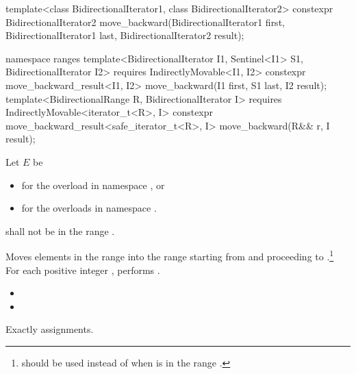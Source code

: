 %
\begin{itemdecl}
template<class BidirectionalIterator1, class BidirectionalIterator2>
  constexpr BidirectionalIterator2
    move_backward(BidirectionalIterator1 first, BidirectionalIterator1 last,
                  BidirectionalIterator2 result);
\end{itemdecl}
\begin{addedblock}
\begin{itemdecl}
namespace ranges {
  template<BidirectionalIterator I1, Sentinel<I1> S1, BidirectionalIterator I2>
    requires IndirectlyMovable<I1, I2>
    constexpr move_backward_result<I1, I2>
      move_backward(I1 first, S1 last, I2 result);
  template<BidirectionalRange R, BidirectionalIterator I>
    requires IndirectlyMovable<iterator_t<R>, I>
    constexpr move_backward_result<safe_iterator_t<R>, I>
      move_backward(R&& r, I result);
}
\end{itemdecl}
\end{addedblock}

\begin{itemdescr}
\begin{addedblock}
\pnum
Let $E$ be
\begin{itemize}
\item {} for the overload in namespace , or
\item {} for the overloads in namespace .
\end{itemize}
\end{addedblock}

\pnum
\requires
{}
shall not be in the range
.

\pnum
\effects
Moves elements in the range 
into the
range 
starting from
and proceeding to .\footnote{
should be used instead of  when 
is in
the range
.}
For each positive integer
,
performs
.

\pnum
\returns
\begin{itemize}
\item {} 
\item {}
\end{itemize}

\pnum
\complexity
Exactly
assignments.
\end{itemdescr}


